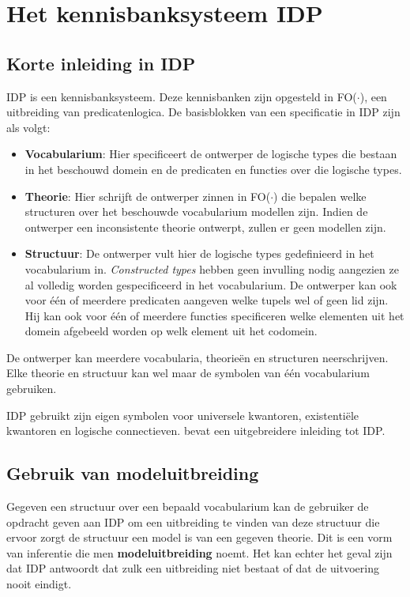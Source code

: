 \chapter{Het kennisbanksysteem IDP}\label{sec:rol-idp}
\section{Korte inleiding in IDP}
IDP is een kennisbanksysteem\cite{DeCatBroes2014PLaa}. Deze kennisbanken zijn opgesteld in FO($\cdot$), een uitbreiding van predicatenlogica. De basisblokken van een specificatie in IDP zijn als volgt:

\begin{itemize}
	\item \textbf{Vocabularium}: Hier specificeert de ontwerper de logische types die bestaan in het beschouwd domein en de predicaten en functies over die logische types.
	\item \textbf{Theorie}: Hier schrijft de ontwerper zinnen in FO($\cdot$) die bepalen welke structuren over het beschouwde vocabularium modellen zijn. Indien de ontwerper een inconsistente theorie ontwerpt, zullen er geen modellen zijn.
	\item \textbf{Structuur}: De ontwerper vult hier de logische types gedefinieerd in het vocabularium in. \textit{Constructed types} hebben geen invulling nodig aangezien ze al volledig worden gespecificeerd in het vocabularium. De ontwerper kan ook voor \'e\'en of meerdere predicaten aangeven welke tupels wel of geen lid zijn. Hij kan ook voor \'e\'en of meerdere functies specificeren welke elementen uit het domein afgebeeld worden op welk element uit het codomein.
\end{itemize}

De ontwerper kan meerdere vocabularia, theorie\"en en structuren neerschrijven. Elke theorie en structuur kan wel maar de symbolen van \'e\'en vocabularium gebruiken.

IDP gebruikt zijn eigen symbolen voor universele kwantoren, existenti\"ele kwantoren en logische connectieven. \cite{DeCatBroes2014PLaa} bevat een uitgebreidere inleiding tot IDP.

\section{Gebruik van modeluitbreiding}
Gegeven een structuur over een bepaald vocabularium kan de gebruiker de opdracht geven aan IDP om een uitbreiding te vinden van deze structuur die ervoor zorgt de structuur een model is van een gegeven theorie. Dit is een vorm van inferentie die men \textbf{modeluitbreiding} noemt. Het kan echter het geval zijn dat IDP antwoordt dat zulk een uitbreiding niet bestaat of dat de uitvoering nooit eindigt.


